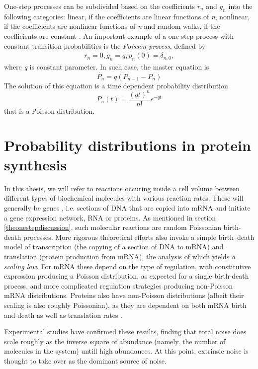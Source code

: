 \documentclass[12pt,a4paper]{report}
\begin{document}
One-step processes can be subdivided based on the coefficients $r_{n}$ and $g_{n}$ into the following categories: linear, if the coefficients are linear functions of \emph{n}, nonlinear, if the coefficients are nonlinear functions of \emph{n} and random walks, if the coefficients are constant \cite{Ragazza,Math}.
\newline
An important example of a one-step process with constant transition probabilities is the \emph{Poisson process}, defined by
\begin{align}
    r_{n} = 0,g_{n}=q,p_{n}(0)=\delta_{n,0},
\end{align}
where \emph{q} is constant parameter. In such case, the master equation is
\begin{equation}
    \dot{P_{n}} = q(P_{n-1}-P_{n})
\end{equation}
The solution of this equation is a time dependent probability distribution
\begin{equation}
    P_{n}(t) = \frac{(qt)^{n}}{n!}e^{-qt}
\end{equation}
that is a Poisson distribution.


\section{Probability distributions in protein synthesis}
In this thesis, we will refer to reactions occuring inside a cell volume between different types of biochemical molecules with various reaction rates. These will generally be genes , i.e. sections of DNA that are copied into mRNA and initiate a gene expression network, RNA or proteins. As mentioned in section \ref{theonestepdiscussion}, such molecular reactions are random Poissonian birth-death processes. More rigorous theoretical efforts also invoke a simple birth–death model of transcription (the copying of a section of DNA to mRNA) and translation (protein production from mRNA), the analysis of which yields \emph{a scaling law}. For mRNA these depend on the type of regulation, with constitutive expression producing a Poisson distribution, as expected for a single birth-death process, and more complicated regulation strategies producing non-Poisson mRNA distributions. Proteins also have non-Poisson distributions (albeit their scaling is also roughly Poissonian), as they are dependent on both mRNA birth and death as well as translation rates \cite{Article}.


Experimental studies have confirmed these results, finding that total noise does scale roughly as the inverse square of abundance (namely, the number of molecules in the system) untill high abundances. At this point, extrinsic noise is thought to take over as the dominant source of noise.
\end{document}
